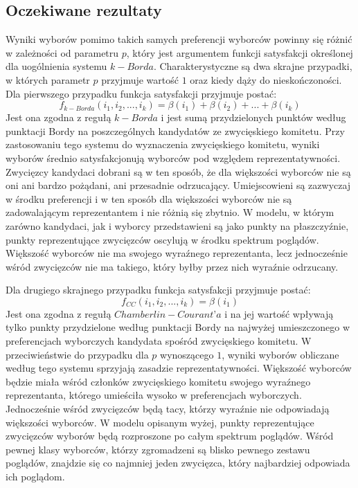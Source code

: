 \documentclass[polish,11pt]{aghthesis}
\begin{document}
\subsection{Oczekiwane rezultaty}
Wyniki wyborów pomimo takich samych preferencji wyborców powinny się różnić w
zależności od parametru $p$, który jest argumentem funkcji satysfakcji określonej dla
uogólnienia systemu $k-Borda$. Charakterystyczne są dwa skrajne przypadki, w których
parametr $p$ przyjmuje wartość $1$ oraz kiedy dąży do nieskończoności. Dla pierwszego
przypadku funkcja satysfakcji przyjmuje postać: $$f_{k-Borda}(i_1, i_2, ..., i_k) = \beta(i_1) + \beta(i_2) + ... + \beta(i_k) 
$$Jest ona zgodna z regułą $k-Borda$ i jest sumą przydzielonych punktów według punktacji
Bordy na poszczególnych kandydatów ze zwycięskiego komitetu. Przy zastosowaniu tego
systemu do wyznaczenia zwycięskiego komitetu, wyniki wyborów średnio satysfakcjonują
wyborców pod względem reprezentatywności. Zwycięzcy kandydaci dobrani są w ten
sposób, że dla większości wyborców nie są oni ani bardzo pożądani, ani przesadnie
odrzucający. Umiejscowieni są zazwyczaj w środku preferencji i w ten sposób dla większości
wyborców nie są zadowalającym reprezentantem i nie różnią się zbytnio. W modelu, w
którym zarówno kandydaci, jak i wyborcy przedstawieni są jako punkty na płaszczyźnie,
punkty reprezentujące zwycięzców oscylują w środku spektrum poglądów. Większość wyborców nie ma swojego wyraźnego reprezentanta, lecz jednocześnie wśród zwycięzców nie ma takiego, który byłby przez nich wyraźnie odrzucany. 

Dla drugiego skrajnego przypadku funkcja satysfakcji przyjmuje postać: $$f_{CC}(i_1, i_2, ..., i_k) = \beta(i_1)$$Jest ona zgodna z regułą $Chamberlin-Courant’a$ i na jej wartość wpływają tylko punkty przydzielone według punktacji Bordy na najwyżej umieszczonego w preferencjach wyborczych kandydata spośród zwycięskiego komitetu. W przeciwieństwie do przypadku dla $p$ wynoszącego $1$, wyniki wyborów obliczane według tego systemu sprzyjają zasadzie reprezentatywności. Większość wyborców będzie miała wśród członków zwycięskiego komitetu swojego wyraźnego reprezentanta, którego umieściła wysoko w preferencjach wyborczych. Jednocześnie wśród zwycięzców będą tacy, którzy wyraźnie nie odpowiadają większości wyborców. W modelu opisanym wyżej, punkty reprezentujące zwycięzców wyborów będą rozproszone po całym spektrum poglądów. Wśród pewnej klasy wyborców, którzy zgromadzeni są blisko pewnego zestawu poglądów, znajdzie się co najmniej jeden zwycięzca, który najbardziej odpowiada ich poglądom.
\end{document}
